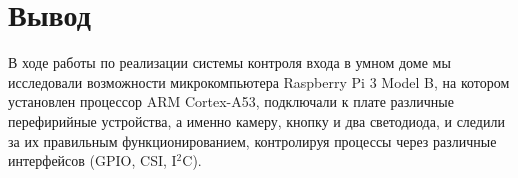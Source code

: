 \documentclass[a4paper,11pt]{article}
\begin{document}
\section{Вывод}
В ходе работы по реализации системы контроля входа в умном доме мы исследовали возможности микрокомпьютера Raspberry Pi 3 Model B, на котором установлен процессор ARM Cortex-A53, подключали к плате различные перефирийные устройства, а именно камеру, кнопку и два светодиода, и следили за их правильным функционированием, контролируя процессы через различные интерфейсов (GPIO, CSI, I$^2$C).
\end{document}
